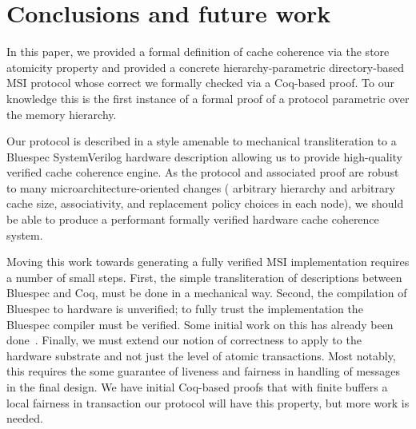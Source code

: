 \section{Conclusions and future work}

In this paper, we provided a formal definition of cache coherence via the store
atomicity property and provided a concrete hierarchy-parametric directory-based
MSI protocol whose correct we formally checked via a Coq-based proof. To our
knowledge this is the first instance of a formal proof of a protocol parametric
over the memory hierarchy.

Our protocol is described in a style amenable to mechanical transliteration to a
Bluespec SystemVerilog hardware description allowing us to provide high-quality
verified cache coherence engine. As the protocol and associated proof are robust
to many microarchitecture-oriented changes (\eg{} arbitrary hierarchy and
arbitrary cache size, associativity, and replacement policy choices in each
node), we should be able to produce a performant formally verified hardware
cache coherence system.

Moving this work towards generating a fully verified MSI implementation requires
a number of small steps. First, the simple transliteration of descriptions
between Bluespec and Coq, must be done in a mechanical way. Second, the
compilation of Bluespec to hardware is unverified; to fully trust the
implementation the Bluespec compiler must be verified. Some initial work on this
has already been done~\cite{TDBLP:conf/cav/BraibantC13}. Finally, we must extend
our notion of correctness to apply to the hardware substrate and not just the
level of atomic transactions. Most notably, this requires the some guarantee of
liveness and fairness in handling of messages in the final design. We have
initial Coq-based proofs that with finite buffers a local fairness in
transaction our protocol will have this property, but more work is needed. 






